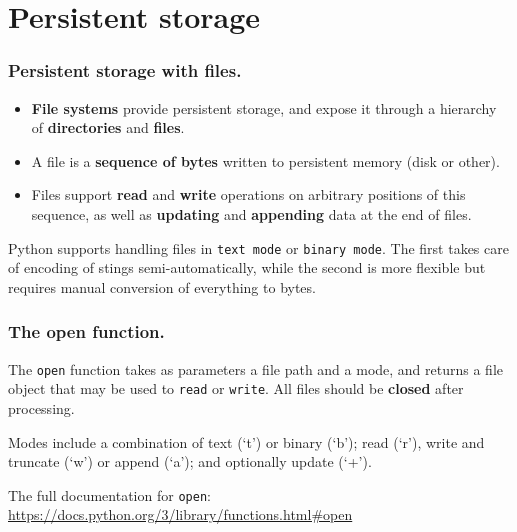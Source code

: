 \documentclass{beamer} %
\newcommand\emc[1]{\textcolor{brightblue}{\textbf{#1}}}
\begin{document}
\section{Persistent storage}

\begin{frame}
\frametitle{Persistent storage with files.}

\begin{itemize}
\item \emc{File systems} provide persistent storage, and expose it through a hierarchy of \emc{directories} and \emc{files}.
\item A file is a \emc{sequence of bytes} written to persistent memory (disk or other).
\item Files support \emc{read} and \emc{write} operations on arbitrary positions of this sequence, as well as \emc{updating} and \emc{appending} data at the end of files.
\end{itemize}

Python supports handling files in \texttt{text mode} or \texttt{binary mode}. The first takes care of encoding of stings semi-automatically, while the second is more flexible but requires manual conversion of everything to bytes.

\end{frame}

\begin{frame}
\frametitle{The open function.}

The \texttt{open} function takes as parameters a file path and a mode, and returns a file object that may be used to \texttt{read} or \texttt{write}. All files should be \emc{closed} after processing.

\vspace{3mm}
Modes include a combination of text (`t') or binary (`b'); read (`r'), write and truncate (`w') or append (`a'); and optionally update (`+').

\vspace{3mm}
The full documentation for \texttt{open}: \url{https://docs.python.org/3/library/functions.html\#open}

\end{frame}

\end{document}

